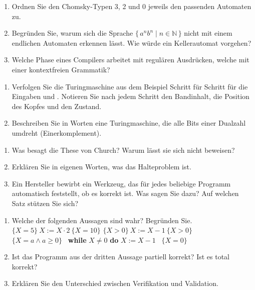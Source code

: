 \begin{enumerate}[label=\alph*)]
\item Ordnen Sie den Chomsky-Typen 3, 2 und 0 jeweils den passenden Automaten zu.
\item Begründen Sie, warum sich die Sprache $\{\, a^n b^n \mid n \in \mathbb{N} \,\}$ nicht mit einem endlichen Automaten erkennen lässt. Wie würde ein Kellerautomat vorgehen?
\item Welche Phase eines Compilers arbeitet mit regulären Ausdrücken, welche mit einer kontextfreien Grammatik?
\end{enumerate}

\begin{enumerate}[label=\alph*)]
\item Verfolgen Sie die Turingmaschine aus dem Beispiel Schritt für Schritt für die Eingaben  und . Notieren Sie nach jedem Schritt den Bandinhalt, die Position des Kopfes und den Zustand.
\item Beschreiben Sie in Worten eine Turingmaschine, die alle Bits einer Dualzahl umdreht (Einerkomplement).
\end{enumerate}

\begin{enumerate}[label=\alph*)]
\item Was besagt die These von Church? Warum lässt sie sich nicht beweisen?
\item Erklären Sie in eigenen Worten, was das Halteproblem ist.
\item Ein Hersteller bewirbt ein Werkzeug, das für jedes beliebige Programm automatisch feststellt, ob es korrekt ist. Was sagen Sie dazu? Auf welchen Satz stützen Sie sich?
\end{enumerate}

\begin{enumerate}[label=\alph*)]
\item Welche der folgenden Aussagen sind wahr? Begründen Sie. \\[1mm]
$\{X = 5\}\ X := X \cdot 2\ \{X = 10\}$ \qquad\qquad
$\{X > 0\}\ X := X - 1\ \{X > 0\}$ \\[1mm]
$\{X = a \wedge a \geq 0\}$ \ \textbf{while} $X \neq 0$ \textbf{do} $X := X - 1$ \ $\{X = 0\}$
\item Ist das Programm aus der dritten Aussage partiell korrekt? Ist es total korrekt?
\item Erklären Sie den Unterschied zwischen Verifikation und Validation.
\end{enumerate}

